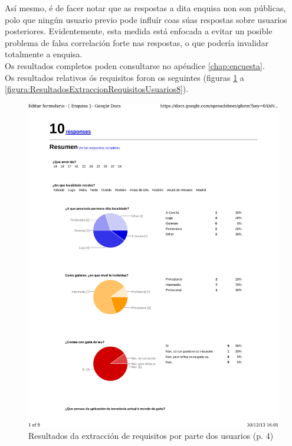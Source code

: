   Así mesmo, é de facer notar que as respostas a dita enquisa non son públicas,
  polo que ningún usuario previo pode influír coas súas respostas sobre
  usuarios posteriores. Evidentemente, esta medida está enfocada a evitar un
  posible problema de falsa correlación forte nas respostas, o que podería
  invalidar totalmente a enquisa. \\

  Os resultados completos poden consultarse no apéndice \ref{chap:encuesta}. \\

  Os resultados relativos ós requisitos foron os seguintes (figuras
  \ref{figura:ResultadosExtraccionRequisitosUsuarios4} a
  \ref{figura:ResultadosExtraccionRequisitosUsuarios8}). \\

  \begin{figure}[htbp]
   \centering
   \includegraphics[scale=0.7,page=4,keepaspectratio=true]{./imagenes/enquisa.pdf}
   \caption{Resultados da extracción de requisitos por parte dos usuarios (p. 4)}
   \label{figura:ResultadosExtraccionRequisitosUsuarios4}
  \end{figure}

